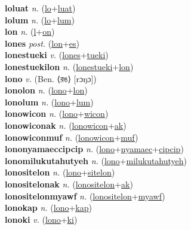 \textbf{loluat} \textit{n.} (\hyperref[lo]{lo}+\hyperref[luat]{luat})
 \label{loluat} \\
\textbf{lolum} \textit{n.} (\hyperref[lo]{lo}+\hyperref[lum]{lum})
 \label{lolum} \\
\textbf{lon} \textit{n.} (\hyperref[l]{l}+\hyperref[on]{on})
 \label{lon} \\
\textbf{lones} \textit{post.} (\hyperref[lon]{lon}+\hyperref[es]{es})
 \label{lones} \\
\textbf{lonestueki} \textit{v.} (\hyperref[lones]{lones}+\hyperref[tueki]{tueki})
 \label{lonestueki} \\
\textbf{lonestuekilon} \textit{n.} (\hyperref[lonestueki]{lonestueki}+\hyperref[lon]{lon})
 \label{lonestuekilon} \\
\textbf{lono} \textit{v.} (Ben. ⟨রঙ⟩ [rɔŋɔ])
 \label{lono} \\
\textbf{lonolon} \textit{n.} (\hyperref[lono]{lono}+\hyperref[lon]{lon})
 \label{lonolon} \\
\textbf{lonolum} \textit{n.} (\hyperref[lono]{lono}+\hyperref[lum]{lum})
 \label{lonolum} \\
\textbf{lonowicon} \textit{n.} (\hyperref[lono]{lono}+\hyperref[wicon]{wicon})
 \label{lonowicon} \\
\textbf{lonowiconak} \textit{n.} (\hyperref[lonowicon]{lonowicon}+\hyperref[ak]{ak})
 \label{lonowiconak} \\
\textbf{lonowiconmuf} \textit{n.} (\hyperref[lonowicon]{lonowicon}+\hyperref[muf]{muf})
 \label{lonowiconmuf} \\
\textbf{lononyamaeccipcip} \textit{n.} (\hyperref[lono]{lono}+\hyperref[nyamaec]{nyamaec}+\hyperref[cipcip]{cipcip})
 \label{lononyamaeccipcip} \\
\textbf{lonomilukutahutyeh} \textit{n.} (\hyperref[lono]{lono}+\hyperref[milukutahutyeh]{milukutahutyeh})
 \label{lonomilukutahutyeh} \\
\textbf{lonositelon} \textit{n.} (\hyperref[lono]{lono}+\hyperref[sitelon]{sitelon})
 \label{lonositelon} \\
\textbf{lonositelonak} \textit{n.} (\hyperref[lonositelon]{lonositelon}+\hyperref[ak]{ak})
 \label{lonositelonak} \\
\textbf{lonositelonmyawf} \textit{n.} (\hyperref[lonositelon]{lonositelon}+\hyperref[myawf]{myawf})
 \label{lonositelonmyawf} \\
\textbf{lonokap} \textit{n.} (\hyperref[lono]{lono}+\hyperref[kap]{kap})
 \label{lonokap} \\
\textbf{lonoki} \textit{v.} (\hyperref[lono]{lono}+\hyperref[ki]{ki})
